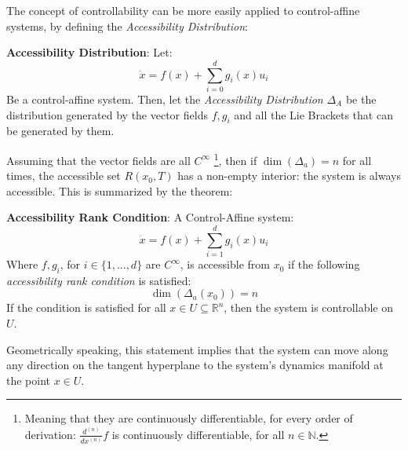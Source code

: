             The concept of controllability can be more easily applied to control-affine systems, by defining the \textit{Accessibility Distribution}:
            \begin{definition}
                \textbf{Accessibility Distribution}: Let:
                \begin{equation*}
                    \dot{x}=f(x)+\sum_{i=0}^{d}g_{i}(x)u_i
                \end{equation*}
                Be a control-affine system. Then, let the \textit{Accessibility Distribution} $\Delta_{A}$ be the distribution generated by the vector fields $f,g_i$ and all the Lie Brackets that can be generated by them. 
            \end{definition}
            Assuming that the vector fields are all $C^\infty$ \footnote{Meaning that they are continuously differentiable, for every order of derivation: $\frac{d^{(n)}}{dx^{(n)}}f$ is continuously differentiable, for all $n \in \mathbb{N}$.}, then if $\dim(\Delta_a)=n$ for all times, the accessible set $R(x_0,T)$ has a non-empty interior: the system is always accessible. This is summarized by the theorem:
            \begin{theorem}\label{Accessibility_rank_condition}
                \textbf{Accessibility Rank Condition}: A Control-Affine system:
                \begin{equation*}
                    \dot{x} = f(x)+\sum_{i=1}^{d}g_i(x)u_i
                \end{equation*}
                Where $f,g_i$, for $i \in \{1,\dots,d\}$ are $C^\infty$, is accessible from $x_0$ if the following \textit{accessibility rank condition} is satisfied:
                \begin{equation}\label{acc_rank_cond}
                    \dim(\Delta_a(x_0))=n
                \end{equation}
                If the condition is satisfied for all $x \in U \subseteq\mathbb{R}^{n}$, then the system is controllable on $U$.
            \end{theorem}
            Geometrically speaking, this statement implies that the system can move along any direction on the tangent hyperplane to the system's dynamics manifold at the point $x\in U$.
